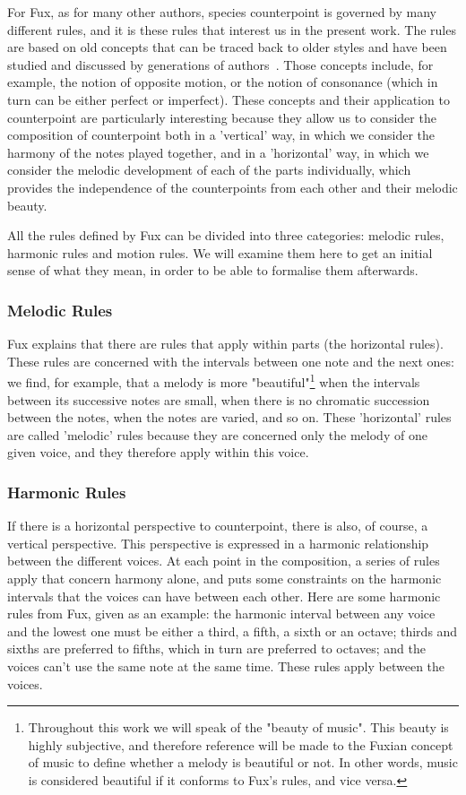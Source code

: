 For Fux, as for many other authors, species counterpoint is governed by many different rules, and it is these rules that interest us in the present work. The rules are based on old concepts that can be traced back to older styles and have been studied and discussed by generations of authors~\cite{crocker1962}. Those concepts include, for example, the notion of opposite motion, or the notion of consonance (which in turn can be either perfect or imperfect). These concepts and their application to counterpoint are particularly interesting because they allow us to consider the composition of counterpoint both in a 'vertical' way, in which we consider the harmony of the notes played together, and in a 'horizontal' way, in which we consider the melodic development of each of the parts individually, which provides the independence of the counterpoints from each other and their melodic beauty.


All the rules defined by Fux can be divided into three categories: melodic rules, harmonic rules and motion rules. We will examine them here to get an initial sense of what they mean, in order to be able to formalise them afterwards.

\subsubsection{Melodic Rules}

Fux explains that there are rules that apply within parts (the horizontal rules). These rules are concerned with the intervals between one note and the next ones: we find, for example, that a melody is more "beautiful"\footnote{Throughout this work we will speak of the "beauty of music". This beauty is highly subjective, and therefore reference will be made to the Fuxian concept of music to define whether a melody is beautiful or not. In other words, music is considered beautiful if it conforms to Fux's rules, and vice versa.} when the intervals between its successive notes are small, when there is no chromatic succession between the notes, when the notes are varied, and so on. These 'horizontal' rules are called 'melodic' rules because they are concerned only the melody of one given voice, and they therefore apply within this voice.


\subsubsection{Harmonic Rules}


If there is a horizontal perspective to counterpoint, there is also, of course, a vertical perspective. This perspective is expressed in a harmonic relationship between the different voices. At each point in the composition, a series of rules apply that concern harmony alone, and puts some constraints on the harmonic intervals that the voices can have between each other. Here are some harmonic rules from Fux, given as an example: the harmonic interval between any voice and the lowest one must be either a third, a fifth, a sixth or an octave; thirds and sixths are preferred to fifths, which in turn are preferred to octaves; and the voices can't use the same note at the same time. These rules apply between the voices.

